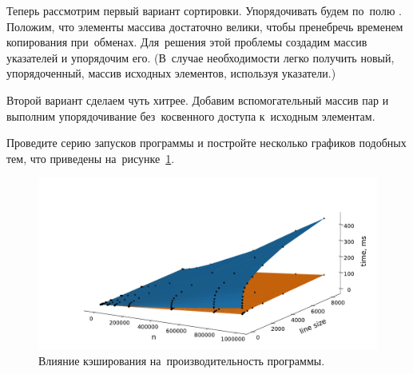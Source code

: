 
Теперь рассмотрим первый вариант сортировки. Упорядочивать будем по~полю . Положим, что элементы массива достаточно велики, чтобы пренебречь временем копирования при~обменах. Для~решения этой проблемы создадим массив указателей и упорядочим его. (В~случае необходимости легко получить новый, упорядоченный, массив исходных элементов, используя указатели.)


Второй вариант сделаем чуть хитрее. Добавим вспомогательный массив пар  и выполним упорядочивание без~косвенного доступа к~исходным элементам.


Проведите серию запусков программы и постройте несколько графиков подобных тем, что приведены на~рисунке~\ref{fig:caching}.

\begin{figure}[h]
  {\centering
    \hfill
    \hfill
    \hfill
    \includegraphics[width=0.7\columnwidth]{images/cache_impact.pdf}

  }
  \caption{Влияние кэширования на~производительность программы.}
  \label{fig:caching}
\end{figure}

